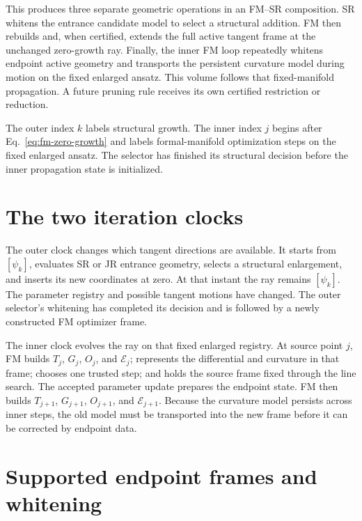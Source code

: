 \documentclass[10pt,twocolumn]{article}
\begin{document}
This produces three separate geometric operations in an FM--SR composition.
SR whitens the entrance candidate model to select a structural addition. FM
then rebuilds and, when certified, extends the full active tangent frame at the
unchanged zero-growth ray. Finally, the inner FM loop repeatedly whitens
endpoint active geometry and transports the persistent curvature model during
motion on the fixed enlarged ansatz. This volume follows that fixed-manifold
propagation. A future pruning rule receives its own certified restriction or
reduction.

The outer index \(k\) labels structural growth. The inner index \(j\) begins
after Eq.~\eqref{eq:fm-zero-growth} and labels formal-manifold optimization
steps on the fixed enlarged ansatz. The selector has finished its structural
decision before the inner propagation state is initialized.

\section*{The two iteration clocks}

The outer clock changes which tangent directions are available. It starts from
\([\psi_k]\), evaluates SR or JR entrance geometry, selects a structural
enlargement, and inserts its new coordinates at zero. At that instant the ray
remains \([\psi_k]\). The parameter registry and possible tangent motions have
changed. The outer selector's whitening has completed its decision and is
followed by a newly constructed FM optimizer frame.

The inner clock evolves the ray on that fixed enlarged registry.
At source point \(j\), FM builds \(T_j\), \(G_j\), \(O_j\), and
\(\mathcal E_j\); represents the differential and curvature in that frame;
chooses one trusted step; and holds the source frame fixed through the line
search. The accepted parameter update prepares the endpoint state. FM then
builds \(T_{j+1}\), \(G_{j+1}\), \(O_{j+1}\), and
\(\mathcal E_{j+1}\). Because the curvature model persists across inner
steps, the old model must be transported into the new frame before it can be
corrected by endpoint data.

\section*{Supported endpoint frames and whitening}
\end{document}
